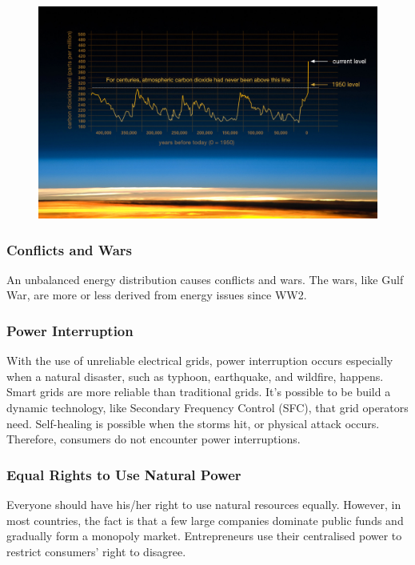\begin{figure}[t]
\center
\includegraphics[scale=0.33]{figure/1_1_1_nasa_co2.jpeg}
\end{figure}

\subsubsection{Conflicts and Wars}
An unbalanced energy distribution causes conflicts and wars. The wars, like Gulf War, are more or less derived from energy issues since WW2. 

\subsubsection{Power Interruption}
With the use of unreliable electrical grids, power interruption occurs especially when a natural disaster, such as typhoon, earthquake, and wildfire, happens. Smart grids are more reliable than traditional grids. It’s possible to be build a dynamic technology, like Secondary Frequency Control (SFC), that grid operators need. Self-healing is possible when the storms hit, or physical attack occurs. Therefore, consumers do not encounter power interruptions. 

\subsubsection{Equal Rights to Use Natural Power}
Everyone should have his/her right to use natural resources equally. However, in most countries, the fact is that a few large companies dominate public funds and gradually form a monopoly market. Entrepreneurs use their centralised power to restrict consumers’ right to disagree. 

